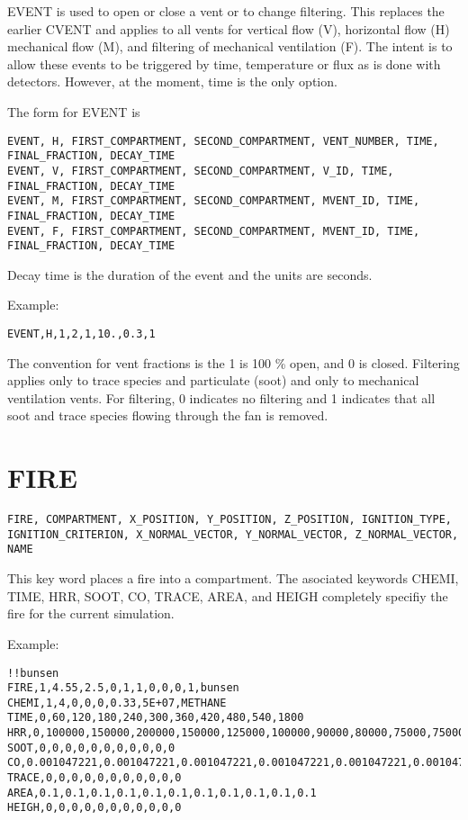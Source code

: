 EVENT is used to open or close a vent or to change filtering. This replaces the earlier CVENT and applies to all vents for vertical flow (V), horizontal flow (H) mechanical flow (M), and filtering of mechanical ventilation (F). The intent is to allow these events to be triggered by time, temperature or flux as is done with detectors. However, at the moment, time is the only option.

The form for EVENT is

\begin{lstlisting}
EVENT, H, FIRST_COMPARTMENT, SECOND_COMPARTMENT, VENT_NUMBER, TIME, FINAL_FRACTION, DECAY_TIME
EVENT, V, FIRST_COMPARTMENT, SECOND_COMPARTMENT, V_ID, TIME, FINAL_FRACTION, DECAY_TIME
EVENT, M, FIRST_COMPARTMENT, SECOND_COMPARTMENT, MVENT_ID, TIME, FINAL_FRACTION, DECAY_TIME
EVENT, F, FIRST_COMPARTMENT, SECOND_COMPARTMENT, MVENT_ID, TIME, FINAL_FRACTION, DECAY_TIME
\end{lstlisting}

Decay time is the duration of the event and the units are seconds.

Example:

\begin{lstlisting}
EVENT,H,1,2,1,10.,0.3,1
\end{lstlisting}

The convention for vent fractions is the 1 is 100 \% open, and 0 is closed. Filtering applies only to trace species and particulate (soot) and only to mechanical ventilation vents. For filtering, 0 indicates no filtering and 1 indicates that all soot and trace species flowing through the fan is removed.

\section{FIRE}

\begin{lstlisting}
FIRE, COMPARTMENT, X_POSITION, Y_POSITION, Z_POSITION, IGNITION_TYPE, IGNITION_CRITERION, X_NORMAL_VECTOR, Y_NORMAL_VECTOR, Z_NORMAL_VECTOR, NAME
\end{lstlisting}

This key word places a fire  into a compartment. The asociated keywords CHEMI, TIME, HRR, SOOT, CO, TRACE, AREA, and HEIGH completely specifiy the fire for the current simulation.

Example:

\begin{lstlisting}
!!bunsen
FIRE,1,4.55,2.5,0,1,1,0,0,0,1,bunsen
CHEMI,1,4,0,0,0,0.33,5E+07,METHANE
TIME,0,60,120,180,240,300,360,420,480,540,1800
HRR,0,100000,150000,200000,150000,125000,100000,90000,80000,75000,75000
SOOT,0,0,0,0,0,0,0,0,0,0,0
CO,0.001047221,0.001047221,0.001047221,0.001047221,0.001047221,0.001047221,0.001047221,0.001047221,0.001047221,0.001047221,0.001047221
TRACE,0,0,0,0,0,0,0,0,0,0,0
AREA,0.1,0.1,0.1,0.1,0.1,0.1,0.1,0.1,0.1,0.1,0.1
HEIGH,0,0,0,0,0,0,0,0,0,0,0
\end{lstlisting}

